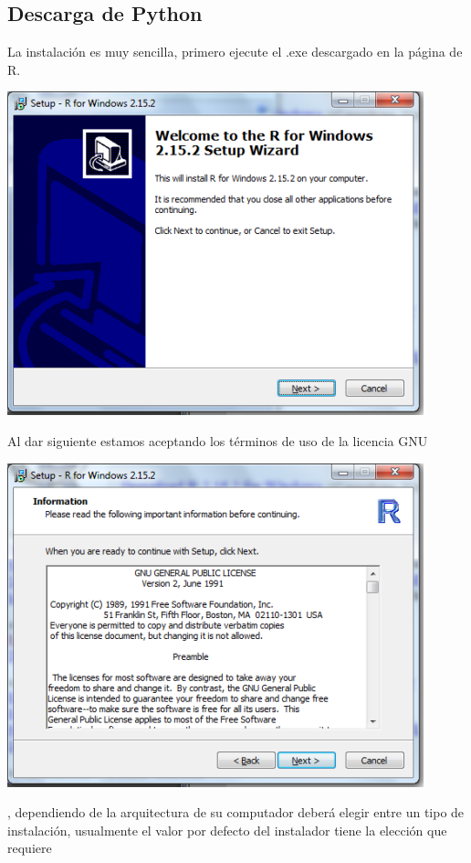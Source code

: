 \documentclass[12pt,hidelinks]{article}
\begin{document}
	\subsection{Descarga de Python}
	La instalación es muy sencilla, primero ejecute el .exe descargado en la página de R.
	\begin{center}
		\includegraphics[scale=0.9]{images/1/install3-1.png}
	\end{center}
	Al dar siguiente estamos aceptando los términos de uso de la licencia GNU
	\begin{center}
		\includegraphics[scale=0.9]{images/1/install3-2.png}
	\end{center}
	, dependiendo de la arquitectura de su computador deberá elegir entre un tipo de instalación, usualmente el valor por defecto del instalador tiene la elección que requiere
\end{document}
